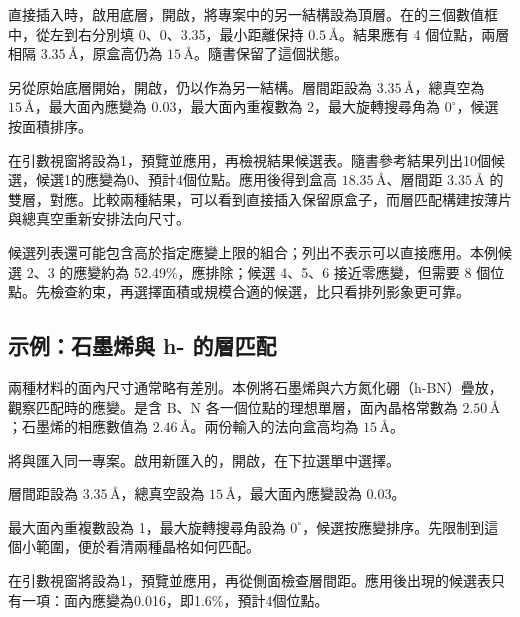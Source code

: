直接插入時，啟用底層，開啟，將專案中的另一結構設為頂層。在的三個數值框中，從左到右分別填 0、0、3.35，最小距離保持 $0.5\,\text{\AA}$。結果應有 4 個位點，兩層相隔 $3.35\,\text{\AA}$，原盒高仍為 $15\,\text{\AA}$。隨書保留了這個狀態。

另從原始底層開始，開啟，仍以作為另一結構。層間距設為 $3.35\,\text{\AA}$，總真空為 $15\,\text{\AA}$，最大面內應變為 0.03，最大面內重複數為 2，最大旋轉搜尋角為 $0^\circ$，候選按面積排序。

在引數視窗將設為1，預覽並應用，再檢視結果候選表。隨書參考結果列出10個候選，候選1的應變為0、預計4個位點。應用後得到盒高 $18.35\,\text{\AA}$、層間距 $3.35\,\text{\AA}$ 的雙層，對應。比較兩種結果，可以看到直接插入保留原盒子，而層匹配構建按薄片與總真空重新安排法向尺寸。

候選列表還可能包含高於指定應變上限的組合；列出不表示可以直接應用。本例候選 2、3 的應變約為 52.49\%，應排除；候選 4、5、6 接近零應變，但需要 8 個位點。先檢查約束，再選擇面積或規模合適的候選，比只看排列影象更可靠。

\subsection{示例：石墨烯與 h- 的層匹配}

兩種材料的面內尺寸通常略有差別。本例將石墨烯與六方氮化硼（h-BN）疊放，觀察匹配時的應變。是含 B、N 各一個位點的理想單層，面內晶格常數為 $2.50\,\text{\AA}$；石墨烯的相應數值為 $2.46\,\text{\AA}$。兩份輸入的法向盒高均為 $15\,\text{\AA}$。

\begin{steps}
  \item 將與匯入同一專案。啟用新匯入的，開啟，在下拉選單中選擇。
  \item 層間距設為 $3.35\,\text{\AA}$，總真空設為 $15\,\text{\AA}$，最大面內應變設為 0.03。
  \item 最大面內重複數設為 1，最大旋轉搜尋角設為 $0^\circ$，候選按應變排序。先限制到這個小範圍，便於看清兩種晶格如何匹配。
  \item 在引數視窗將設為1，預覽並應用，再從側面檢查層間距。應用後出現的候選表只有一項：面內應變為0.016，即1.6\%，預計4個位點。
\end{steps}

